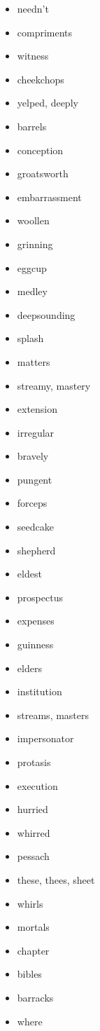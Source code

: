 \documentclass{article}
\begin{document}
\begin{itemize}
    \item needn't
    \item compriments
    \item witness
    \item cheekchops
    \item yelped, deeply
    \item barrels
    \item conception
    \item groatsworth
    \item embarrassment
    \item woollen
    \item grinning
    \item eggcup
    \item medley
    \item deepsounding
    \item splash
    \item matters
    \item streamy, mastery
    \item extension
    \item irregular
    \item bravely
    \item pungent
    \item forceps
    \item seedcake
    \item shepherd
    \item eldest
    \item prospectus
    \item expenses
    \item guinness
    \item elders
    \item institution
    \item streams, masters
    \item impersonator
    \item protasis
    \item execution
    \item hurried
    \item whirred
    \item pessach
    \item these, thees, sheet
    \item whirls
    \item mortals
    \item chapter
    \item bibles
    \item barracks
    \item where

\end{itemize}
\end{document}
